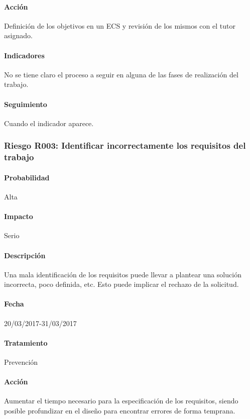 \documentclass[10pt,a4paper]{article}
\begin{document}
				\paragraph{Acción} Definición de los objetivos en un ECS y revisión de los mismos con el tutor asignado. %
				\paragraph{Indicadores} No se tiene claro el proceso a seguir en alguna de las fases de realización del trabajo. %
				\paragraph{Seguimiento}	Cuando el indicador aparece. %
				
			\subsubsection{Riesgo R003: Identificar incorrectamente los requisitos del trabajo }
				\paragraph{Probabilidad} Alta
				\paragraph{Impacto}	Serio
				\paragraph{Descripción} Una mala identificación de los requisitos puede llevar a plantear una solución incorrecta, poco definida, etc. Esto puede implicar el rechazo de la solicitud.
				\paragraph{Fecha} 20/03/2017-31/03/2017 %
				\paragraph{Tratamiento} Prevención %
				\paragraph{Acción} Aumentar el tiempo necesario para la especificación de los requisitos, siendo posible profundizar en el diseño para encontrar errores de forma temprana. %
\end{document}
